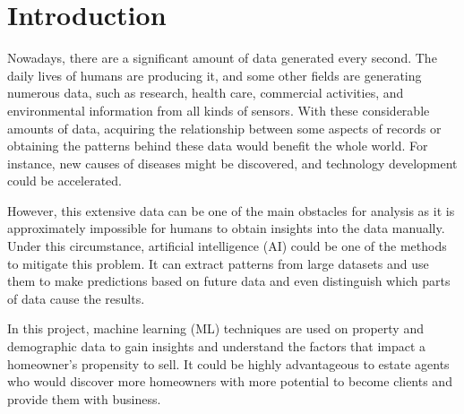 \documentclass[12pt,twoside]{report}
\date{June 2022}
\begin{document}



\clearpage{\pagestyle{empty}\cleardoublepage}
\setcounter{page}{1}
\pagestyle{fancy}


\cleardoublepage

\clearpage{\pagestyle{empty}\cleardoublepage}

\tableofcontents 


\clearpage{\pagestyle{empty}\cleardoublepage}
\setcounter{page}{1}
\fancyhead[LE,RO]{\slshape \rightmark}
\fancyhead[LO,RE]{\slshape \leftmark}

\chapter{Introduction}

Nowadays, there are a significant amount of data generated every second. The daily lives of humans are producing it, and some other fields are generating numerous data, such as research, health care, commercial activities, and environmental information from all kinds of sensors. With these considerable amounts of data,  acquiring the relationship between some aspects of records or obtaining the patterns behind these data would benefit the whole world. For instance, new causes of diseases might be discovered, and technology development could be accelerated.
\bigskip

However, this extensive data can be one of the main obstacles for analysis as it is approximately impossible for humans to obtain insights into the data manually. Under this circumstance, artificial intelligence (AI) could be one of the methods to mitigate this problem. It can extract patterns from large datasets and use them to make predictions based on future data and even distinguish which parts of data cause the results.
\bigskip

In this project, machine learning (ML) techniques are used on property and demographic data to gain insights and understand the factors that impact a homeowner's propensity to sell. It could be highly advantageous to estate agents who would discover more homeowners with more potential to become clients and provide them with business. 
\end{document}
